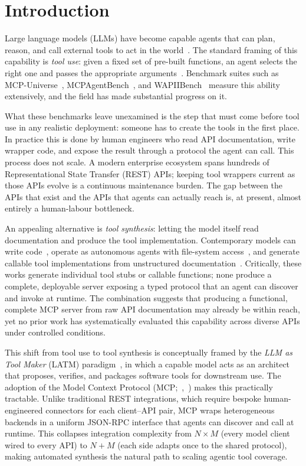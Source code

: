 \chapter{Introduction}
\label{sec:introduction}

Large language models (LLMs) have become capable agents that can plan, reason, and call external tools to act in the world~\citep{brown2020gpt3,codeact2024}. The standard framing of this capability is \emph{tool use}: given a fixed set of pre-built functions, an agent selects the right one and passes the appropriate arguments~\citep{schick2023toolformer}. Benchmark suites such as MCP-Universe~\citep{mcpuniverse2025}, MCPAgentBench~\citep{mcpagentbench2024}, and WAPIIBench~\citep{wapiibench2025} measure this ability extensively, and the field has made substantial progress on it.

What these benchmarks leave unexamined is the step that must come before tool use in any realistic deployment: someone has to create the tools in the first place. In practice this is done by human engineers who read API documentation, write wrapper code, and expose the result through a protocol the agent can call. This process does not scale. A modern enterprise ecosystem spans hundreds of Representational State Transfer (REST) APIs; keeping tool wrappers current as those APIs evolve is a continuous maintenance burden. The gap between the APIs that exist and the APIs that agents can actually reach is, at present, almost entirely a human-labour bottleneck.

An appealing alternative is \emph{tool synthesis}: letting the model itself read documentation and produce the tool implementation. Contemporary models can write code~\citep{toolfactory2025}, operate as autonomous agents with file-system access~\citep{codeact2024}, and generate callable tool implementations from unstructured documentation~\citep{doc2agent2025}. Critically, these works generate individual tool stubs or callable functions; none produce a complete, deployable server exposing a typed protocol that an agent can discover and invoke at runtime. The combination suggests that producing a functional, complete MCP server from raw API documentation may already be within reach, yet no prior work has systematically evaluated this capability across diverse APIs under controlled conditions.

This shift from tool use to tool synthesis is conceptually framed by the \emph{LLM as Tool Maker} (LATM) paradigm~\citep{cai2023latm}, in which a capable model acts as an architect that proposes, verifies, and packages software tools for downstream use. The adoption of the Model Context Protocol (MCP;~\citeauthor{anthropic2024mcp},~\citeyear{anthropic2024mcp}) makes this practically tractable. Unlike traditional REST integrations, which require bespoke human-engineered connectors for each client--API pair, MCP wraps heterogeneous backends in a uniform JSON-RPC interface that agents can discover and call at runtime. This collapses integration complexity from $N \times M$ (every model client wired to every API) to $N + M$ (each side adapts once to the shared protocol), making automated synthesis the natural path to scaling agentic tool coverage.

